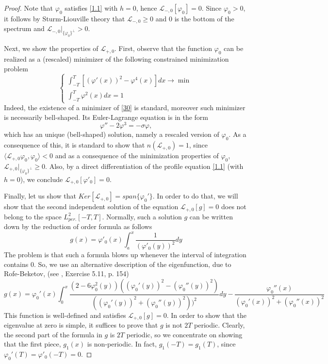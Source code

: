 \documentclass[12pt]{amsart}
\theoremstyle{definition}
\theoremstyle{remark}
\numberwithin{equation}{section}
\renewcommand{\(}{\left(}
\renewcommand{\)}{\right)}
\renewcommand{\[}{\left[}
\renewcommand{\]}{\right]}
\newcommand{\f}[2]{\frac{#1}{#2}}
\newcommand{\cl}{{\mathcal L}}
\newcommand{\si}{\sigma}
\newcommand{\vp}{\varphi}
\newcommand{\dpr}[2]{\langle #1,#2 \rangle}
\begin{document}
 \begin{proof}
 Note that $\vp_0$ satisfies \eqref{1.1} with $h=0$, hence $\cl_{-,0}[\vp_0]=0$. Since $\vp_0>0$, it follows
 by Sturm-Liouville theory that $\cl_{-,0}\geq 0$ and $0$ is the bottom of the spectrum and
 $\cl_{-,0}|_{\{\vp_0\}^\perp}>0$.

 Next, we show the properties of $\cl_{+,0}$. First, observe that the function $\vp_0$ can be realized as a (rescaled)
 minimizer of the following constrained minimization problem
 \begin{equation}
 \label{30}
 \left\{
 \begin{array}{l}
 \int_{-T}^T [(\vp'(x))^2 - \vp^4(x)] dx\to \min \\
 \int_{-T}^T \vp^2(x) dx=1
 \end{array}
 \right.
 \end{equation}
 Indeed, the existence of a minimizer of \eqref{30} is standard, moreover such minimizer is necessarily
  bell-shaped. Its Euler-Lagrange equation is in the form
\begin{equation}
\label{31}
\vp''- 2 \vp^3 = -\si \vp,
\end{equation}
which has an unique (bell-shaped) solution, namely a rescaled version of $\vp_0$.
As a consequence of this, it is standard to show that $n(\cl_{+,0})=1$, since $\dpr{\cl_{+,0} \vp_0}{\vp_0}<0$ and as a consequence of the minimization properties of $\vp_0$,
$\cl_{+,0}|_{\{\vp_0\}^\perp}\geq 0$. Also, by a direct differentiation of the profile equation \eqref{1.1} (with $h=0$), we conclude $\cl_{+,0}[\vp'_0]=0$.

Finally, let us show that $Ker[\cl_{+,0}]=span\{\vp_0'\}$. In order to do that, we will show that the  second independent solution of the equation  $\cl_{+,0}[g]=0$ does not belong to the space $L^2_{per.}[-T,T]$. Normally,
 such a solution $g$ can be written down by the reduction of order   formula as follows
$$
g(x)=\vp'_0(x)\int_{a}^x \f{1}{(\vp'_0(y))^2} dy
$$
The problem is that such a formula blows up whenever the interval of integration contains $0$. So, we use an alternative description of the eigenfunction, due to Rofe-Beketov, (see \cite{Teschl},  Exercise 5.11, p. 154)
$$
g(x)=\vp_0'(x) \int_0^x \f{(2-6\vp_0^2(y))((\vp_0'(y))^2-(\vp_0''(y))^2)}{((\vp_0'(y))^2+(\vp_0''(y))^2))^2} dy -
\f{\vp_0''(x)}{(\vp_0'(x))^2+(\vp_0''(x))^2}
$$
This function is well-defined and satisfies $\cl_{+,0}[g]=0$. In order to show that the eigenvalue at zero is simple, it suffices to prove that $g$ is not $2T$ periodic. Clearly, the second part of the formula in $g$ is $2T$ periodic, so we concentrate on showing that the first piece, $g_1(x)$  is non-periodic. In fact, $g_1(-T)=g_1(T)$, since $\vp_0'(T)=\vp'_0(-T)=0$.


\end{proof}
\end{document}
